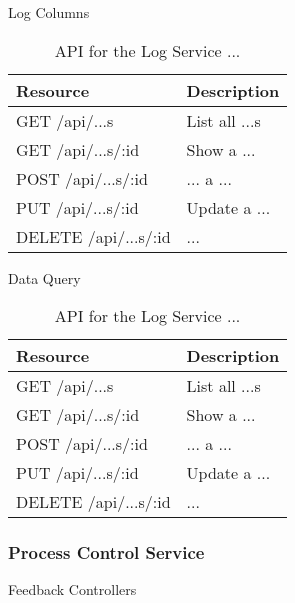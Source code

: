       \large{Log Columns}

      \begin{table}[H]
        \centering
        \begin{tabular}{p{6cm} p{10cm}}
          \toprule
          \textbf{Resource} & \textbf{Description} \\ [0.5ex]
          \midrule
          GET /api/...s & List all ...s \\
          GET /api/...s/:id & Show a ... \\
          POST /api/...s/:id & ... a ... \\
          PUT /api/...s/:id & Update a ... \\
          DELETE /api/...s/:id & ... \\
          \bottomrule
        \end{tabular}
        \caption{API for the Log Service ...}\label{tab:rest-log-...}
      \end{table}

      \large{Data Query}

      \begin{table}[H]
        \centering
        \begin{tabular}{p{6cm} p{10cm}}
          \toprule
          \textbf{Resource} & \textbf{Description} \\ [0.5ex]
          \midrule
          GET /api/...s & List all ...s \\
          GET /api/...s/:id & Show a ... \\
          POST /api/...s/:id & ... a ... \\
          PUT /api/...s/:id & Update a ... \\
          DELETE /api/...s/:id & ... \\
          \bottomrule
        \end{tabular}
        \caption{API for the Log Service ...}\label{tab:rest-log-...}
      \end{table}

    \subsubsection{Process Control Service}\label{sec:rest-control}

      \large{Feedback Controllers}
